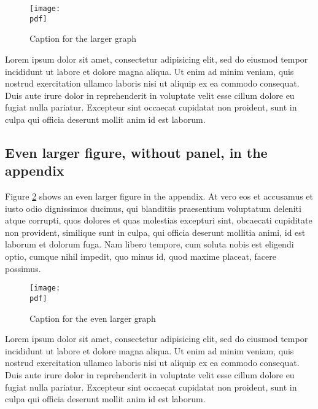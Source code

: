 \documentclass[letterpaper,12pt,leqno]{article}
\newcommand{\pdf}{figures.pdf}
\begin{document}
\begin{figure}[t]
\texttt{[image: \\pdf]}
\caption{Caption for the larger graph}
\label{f:appendix1}\end{figure}

Lorem ipsum dolor sit amet, consectetur adipisicing elit, sed do eiusmod
tempor incididunt ut labore et dolore magna aliqua. Ut enim ad minim veniam,
quis nostrud exercitation ullamco laboris nisi ut aliquip ex ea commodo
consequat. Duis aute irure dolor in reprehenderit in voluptate velit esse
cillum dolore eu fugiat nulla pariatur. Excepteur sint occaecat cupidatat non
proident, sunt in culpa qui officia deserunt mollit anim id est laborum.

\subsection{Even larger figure, without panel, in the appendix} 

Figure \ref{f:appendix2} shows an even larger figure in the appendix. At vero eos et accusamus et iusto odio dignissimos ducimus, qui blanditiis praesentium voluptatum deleniti atque corrupti, quos dolores et quas molestias excepturi sint, obcaecati cupiditate non provident, similique sunt in culpa, qui officia deserunt mollitia animi, id est laborum et dolorum fuga. Nam libero tempore, cum soluta nobis est eligendi optio, cumque nihil impedit, quo minus id, quod maxime placeat, facere possimus.

\begin{figure}[p]
\texttt{[image: \\pdf]}
\caption{Caption for the even larger graph}
\label{f:appendix2}\end{figure}

Lorem ipsum dolor sit amet, consectetur adipisicing elit, sed do eiusmod
tempor incididunt ut labore et dolore magna aliqua. Ut enim ad minim veniam,
quis nostrud exercitation ullamco laboris nisi ut aliquip ex ea commodo
consequat. Duis aute irure dolor in reprehenderit in voluptate velit esse
cillum dolore eu fugiat nulla pariatur. Excepteur sint occaecat cupidatat non
proident, sunt in culpa qui officia deserunt mollit anim id est laborum.
\end{document}

